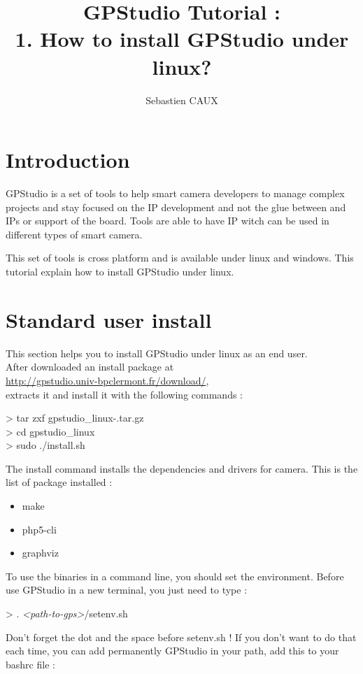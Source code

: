 \documentclass[10pt,a4paper]{article}
\author{Sebastien CAUX}
\title{GPStudio Tutorial : \\ 1. How to install GPStudio under linux? \version}
\begin{document}
\maketitle
\section{Introduction}
GPStudio is a set of tools to help smart camera developers to manage complex projects and stay focused on the IP development and not the glue between and IPs or support of the board. Tools are able to have IP witch can be used in different types of smart camera.

This set of tools is cross platform and is available under linux and windows. This tutorial explain how to install GPStudio under linux.

\section{Standard user install}
This section helps you to install GPStudio under linux as an end user.\\

After downloaded an install package at \\
\mbox{\url{http://gpstudio.univ-bpclermont.fr/download/}}, \\
extracts it and install it with the following commands :

\begin{sample}
> tar zxf gpstudio\_linux-\version.tar.gz \\
> cd gpstudio\_linux \\
> sudo ./install.sh
\end{sample}

The install command installs the dependencies and drivers for camera. This is the list of package installed :
\begin{itemize}
\item make
\item php5-cli
\item graphviz
\end{itemize}

To use the binaries in a command line, you should set the environment. Before use GPStudio in a new terminal, you just need to type :

\begin{sample}
> . \emph{<path-to-gps>}/setenv.sh
\end{sample}

Don't forget the dot and the space before setenv.sh ! If you don't want to do that each time, you can add permanently GPStudio in your path, add this to your bashrc file :
\end{document}
